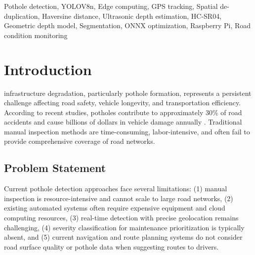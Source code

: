 \documentclass{ieeeaccess}
\begin{document}
\begin{keywords}
Pothole detection, YOLOV8n, Edge computing, GPS tracking, Spatial de-duplication, Haversine distance, Ultrasonic depth estimation, HC-SR04, Geometric depth model, Segmentation, ONNX optimization, Raspberry Pi, Road condition monitoring
\end{keywords}

\titlepgskip=-15pt

\maketitle

\section{Introduction}
\label{sec:introduction}
 infrastructure degradation, particularly pothole formation, represents a persistent challenge affecting road safety, vehicle longevity, and transportation efficiency. According to recent studies, potholes contribute to approximately 30\% of road accidents and cause billions of dollars in vehicle damage annually \cite{b1}. Traditional manual inspection methods are time-consuming, labor-intensive, and often fail to provide comprehensive coverage of road networks.

\subsection{Problem Statement}
Current pothole detection approaches face several limitations: (1) manual inspection is resource-intensive and cannot scale to large road networks, (2) existing automated systems often require expensive equipment and cloud computing resources, (3) real-time detection with precise geolocation remains challenging, (4) severity classification for maintenance prioritization is typically absent, and (5) current navigation and route planning systems do not consider road surface quality or pothole data when suggesting routes to drivers.
\end{document}
